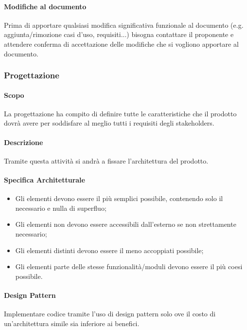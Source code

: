 \documentclass[a4paper, 12pt]{article}
\begin{document}
\paragraph{Modifiche al documento}
Prima di apportare qualsiasi modifica significativa funzionale al documento (e.g. 
aggiunta/rimozione casi d'uso, requisiti...) bisogna contattare il proponente 
e attendere conferma di accettazione delle modifiche che si vogliono apportare
al documento.

\subsubsection{Progettazione}
\paragraph{Scopo}
La progettazione ha compito di definire tutte le caratteristiche che il prodotto dovrà avere per soddisfare al meglio
tutti i requisiti degli stakeholders.
\paragraph{Descrizione}
Tramite questa attività si andrà a fissare l'architettura del prodotto.
\paragraph{Specifica Architetturale}
\begin{itemize}
	\item Gli elementi devono essere il più semplici possibile, contenendo solo il necessario e nulla di superfluo;
	\item Gli elementi non devono essere accessibili dall'esterno se non strettamente necessario;
	\item Gli elementi distinti devono essere il meno accoppiati possibile;
	\item Gli elementi parte delle stesse funzionalità/moduli devono essere il più coesi possibile.
\end{itemize}
\paragraph{Design Pattern}
Implementare codice tramite l'uso di design pattern solo ove il costo di un'architettura simile sia inferiore ai benefici.
\end{document}
